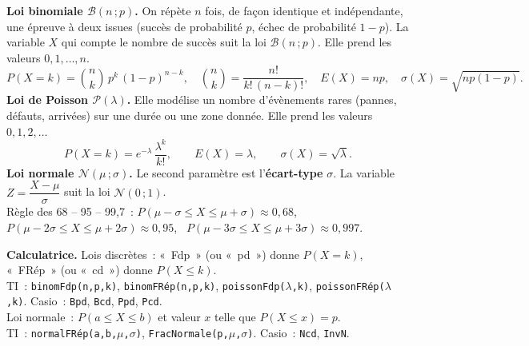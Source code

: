 \documentclass[a4paper,11pt]{article}
\begin{document}
\begin{rappel}
\textbf{Loi binomiale $\mathcal{B}(n\,;p)$.} On répète $n$ fois, de façon identique et indépendante, une épreuve à deux issues (succès de probabilité $p$, échec de probabilité $1-p$). La variable $X$ qui compte le nombre de succès suit la loi $\mathcal{B}(n\,;p)$. Elle prend les valeurs $0, 1, \dots, n$.
\[
P(X = k) = \binom{n}{k}\,p^{k}\,(1-p)^{n-k},\quad \binom{n}{k} = \frac{n!}{k!\,(n-k)!},\quad E(X) = np,\quad \sigma(X) = \sqrt{np(1-p)}.
\]
\textbf{Loi de Poisson $\mathcal{P}(\lambda)$.} Elle modélise un nombre d'évènements rares (pannes, défauts, arrivées) sur une durée ou une zone donnée. Elle prend les valeurs $0, 1, 2, \dots$
\[
P(X = k) = e^{-\lambda}\,\frac{\lambda^{k}}{k!},\qquad E(X) = \lambda,\qquad \sigma(X) = \sqrt{\lambda}.
\]
\textbf{Loi normale $\mathcal{N}(\mu\,;\sigma)$.} Le second paramètre est l'\textbf{écart-type} $\sigma$. La variable $Z = \dfrac{X-\mu}{\sigma}$ suit la loi $\mathcal{N}(0\,;1)$.\\
Règle des 68 -- 95 -- 99,7~: $P(\mu-\sigma\leq X\leq\mu+\sigma)\approx 0{,}68$, \ $P(\mu-2\sigma\leq X\leq\mu+2\sigma)\approx 0{,}95$, \ $P(\mu-3\sigma\leq X\leq\mu+3\sigma)\approx 0{,}997$.

\smallskip
\textbf{Calculatrice.} Lois discrètes~: «~Fdp~» (ou «~pd~») donne $P(X = k)$, «~FRép~» (ou «~cd~») donne $P(X \leq k)$.\\
{\small TI~: \texttt{binomFdp(n,p,k)}, \texttt{binomFRép(n,p,k)}, \texttt{poissonFdp($\lambda$,k)}, \texttt{poissonFRép($\lambda$,k)}. \quad Casio~: \texttt{Bpd}, \texttt{Bcd}, \texttt{Ppd}, \texttt{Pcd}.}\\
Loi normale~: $P(a\leq X\leq b)$ et valeur $x$ telle que $P(X\leq x) = p$.\\
{\small TI~: \texttt{normalFRép(a,b,$\mu$,$\sigma$)}, \texttt{FracNormale(p,$\mu$,$\sigma$)}. \quad Casio~: \texttt{Ncd}, \texttt{InvN}.}
\end{rappel}

\newpage
\end{document}
